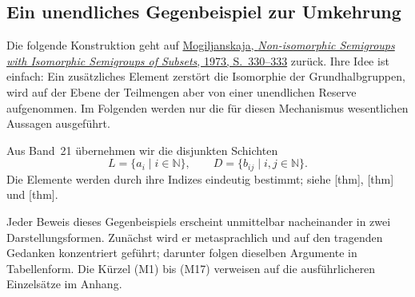 \documentclass[main.tex]{subfiles}
\begin{document}
\subsection{Ein unendliches Gegenbeispiel zur Umkehrung}

Die folgende Konstruktion geht auf
\href{https://doi.org/10.1007/BF02389140}%
  {Mogiljanskaja, \emph{Non-isomorphic Semigroups with Isomorphic
  Semigroups of Subsets}, 1973, S.~330--333}
zurück. Ihre Idee ist einfach: Ein zusätzliches Element zerstört die
Isomorphie der Grundhalbgruppen, wird auf der Ebene der Teilmengen aber von
einer unendlichen Reserve aufgenommen. Im Folgenden werden nur die für diesen
Mechanismus wesentlichen Aussagen ausgeführt.

Aus Band~21 übernehmen wir die disjunkten Schichten
\[
  L=\{a_i\mid i\in\mathbb N\},
  \qquad
  D=\{b_{ij}\mid i,j\in\mathbb N\}.
\]
Die Elemente werden durch ihre Indizes eindeutig bestimmt; siehe
[thm],
[thm] und
[thm].

Jeder Beweis dieses Gegenbeispiels erscheint unmittelbar nacheinander in zwei
Darstellungsformen. Zunächst wird er metasprachlich und auf den tragenden
Gedanken konzentriert geführt; darunter folgen dieselben Argumente in
Tabellenform. Die Kürzel \textup{(M1)} bis \textup{(M17)} verweisen auf die
ausführlicheren Einzelsätze im Anhang.

\end{document}
